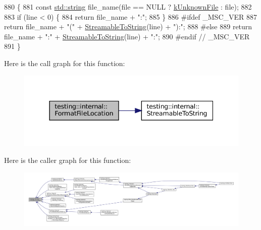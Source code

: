 \begin{DoxyCode}
880                                                                     \{
881   \textcolor{keyword}{const} \hyperlink{namespacetesting_1_1internal_a8e8ff5b11e64078831112677156cb111}{std::string} file\_name(file == NULL ? \hyperlink{namespacetesting_1_1internal_abae7a5775c901f2fd12b058b00d09840}{kUnknownFile} : file);
882 
883   \textcolor{keywordflow}{if} (line < 0) \{
884     \textcolor{keywordflow}{return} file\_name + \textcolor{stringliteral}{":"};
885   \}
886 \textcolor{preprocessor}{#ifdef \_MSC\_VER}
887   \textcolor{keywordflow}{return} file\_name + \textcolor{stringliteral}{"("} + \hyperlink{namespacetesting_1_1internal_aad4beed95d0846e6ffc5da0978ef3bb9}{StreamableToString}(line) + \textcolor{stringliteral}{"):"};
888 \textcolor{preprocessor}{#else}
889   \textcolor{keywordflow}{return} file\_name + \textcolor{stringliteral}{":"} + \hyperlink{namespacetesting_1_1internal_aad4beed95d0846e6ffc5da0978ef3bb9}{StreamableToString}(line) + \textcolor{stringliteral}{":"};
890 \textcolor{preprocessor}{#endif  // \_MSC\_VER}
891 \}
\end{DoxyCode}
Here is the call graph for this function\+:
\nopagebreak
\begin{figure}[H]
\begin{center}
\leavevmode
\includegraphics[width=337pt]{namespacetesting_1_1internal_a31b7c3abed4a7c395f42c61e993989f4_cgraph}
\end{center}
\end{figure}
Here is the caller graph for this function\+:
\nopagebreak
\begin{figure}[H]
\begin{center}
\leavevmode
\includegraphics[width=350pt]{namespacetesting_1_1internal_a31b7c3abed4a7c395f42c61e993989f4_icgraph}
\end{center}
\end{figure}
\mbox{\label{namespacetesting_1_1internal_a91ab078f10adc669f09b7f604975c518}} 
